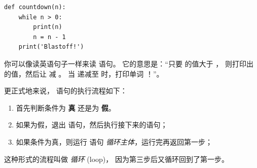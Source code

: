 \begin{lstlisting}
def countdown(n):
    while n > 0:
        print(n)
        n = n - 1
    print('Blastoff!')
\end{lstlisting}

%

你可以像读英语句子一样来读  语句。 它的意思是：``只要  的值大于 ， 则打印出  的值，然后让  减 。 当  递减至  时，打印单词 ！''。


更正式地来说， 语句的执行流程如下：


\begin{enumerate}

\item 首先判断条件为 {\bf 真} 还是为 {\bf 假}。

\item 如果为假，退出  语句，然后执行接下来的语句；

\item 如果条件为真，则运行  语句 {\em 循环主体}，运行完再返回第一步；

\end{enumerate}

    

这种形式的流程叫做 {\em 循环} (loop)， 因为第三步后又循环回到了第一步。
    

  

